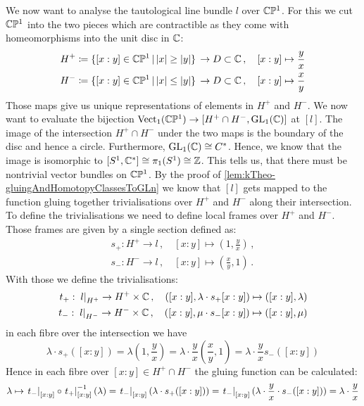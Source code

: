 \begin{example} \label{ex:kTheo-tautopogicalLineBundleOverCP1}
	We now want to analyse the tautological line bundle $l$ over $\mathbb{C}\mathbb{P}^1$. For this we cut $\mathbb{C}\mathbb{P}^1$ into the two pieces which are contractible as they come with homeomorphisms into the unit disc in $\mathbb{C}$:
	\begin{align*}
		H^+&\coloneq \{[x:y]\in \mathbb{C}\mathbb{P}^1\,|\, \lvert x\rvert\geq \lvert y\rvert\}\, \to D\subset \mathbb{C}\,,\quad [x:y]\mapsto \frac{y}{x}\\
		H^-&\coloneq \{[x:y] \in \mathbb{C}\mathbb{P}^1\,|\, \lvert x\rvert\leq \lvert y\rvert\}\,\to D\subset \mathbb{C}\,,\quad [x:y]\mapsto \frac{x}{y}
	\end{align*} Those maps give us unique representations of elements in $H^+$ and $H^-$. We now want to evaluate the bijection $\operatorname{\mathrm{Vect}}_1(\mathbb{C}\mathbb{P}^1)\to [H^+\cap H^-,\mathrm{GL}_1(\mathbb{C})]$ at $[l]$. 
	The image of the intersection $H^+\cap H^-$ under the two maps is the boundary of the disc and hence a circle. Furthermore, $\mathrm{GL}_1(\mathbb{C})\cong C^*$. Hence, we know that the image is isomorphic to $[S^1,\mathbb{C}^*]\cong \pi_1(S^1)\cong \mathbb{Z}$. This tells us, that there must be nontrivial vector bundles on $\mathbb{C}\mathbb{P}^1$. By the proof of \ref{lem:kTheo-gluingAndHomotopyClassesToGLn} we know that $[l]$ gets mapped to the function gluing together trivialisations over $H^+$ and $H^-$ along their intersection. To define the trivialisations we need to define local frames over $H^+$ and $H^-$. Those frames are given by a single section defined as:
	\begin{align*}
		s_+:H^+\to l\,,\quad [x:y]\mapsto (1,\frac{y}{x})\,,\\
		s_-:H^-\to l\,,\quad [x:y]\mapsto (\frac{x}{y},1)\,.
	\end{align*} With those we define the trivialisations:
	\begin{align*}
		t_+:\,\left.l\right|_{H^+}\to H^+\times \mathbb{C}\,,\quad ([x:y],\lambda\cdot s_+[x:y])\mapsto ([x:y],\lambda)\\
		t_-:\,\left.l\right|_{H^-}\to H^-\times \mathbb{C}\,,\quad ([x:y],\mu\cdot s_-[x:y])\mapsto ([x:y],\mu)
	\end{align*}in each fibre over the intersection we have
	\begin{equation*}
		\lambda\cdot s_+([x:y])=\lambda(1,\frac{y}{x})=\lambda \cdot \frac{y}{x}(\frac{x}{y},1)=\lambda\cdot \frac{y}{x}s_-([x:y])
	\end{equation*}
Hence in each fibre over $[x:y]\in H^+\cap H^-$ the gluing function can be calculated:
\begin{equation*}
	\lambda\mapsto \restr{t_-}{[x:y]}\circ \restr{t_+}{[x:y]}^{-1}(\lambda)=\restr{t_-}{[x:y]}(\lambda \cdot s_+([x:y]))=\restr{t_-}{[x:y]}(\lambda\cdot \frac{y}{x} \cdot s_-([x:y]))=\lambda \cdot \frac{y}{x}

\end{equation*}
\end{example}
